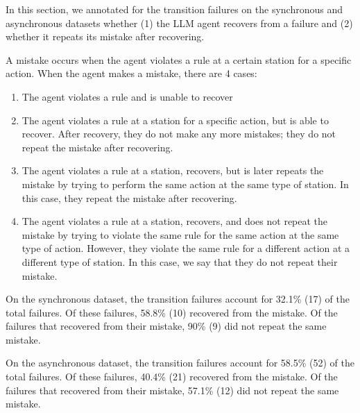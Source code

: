 In this section, we annotated for the transition failures on the synchronous and asynchronous datasets whether (1) the LLM agent recovers from a failure and (2) whether it repeats its mistake after recovering.


A mistake occurs when the agent violates a rule at a certain station for a specific action. When the agent makes a mistake, there are 4 cases:
\begin{enumerate}
    \item The agent violates a rule and is unable to recover
    \item The agent violates a rule at a station for a specific action, but is able to recover. After recovery, they do not make any more mistakes; they do not repeat the mistake after recovering. 
    \item The agent violates a rule at a station, recovers, but is later repeats the mistake by trying to perform the same action at the same type of station. In this case, they repeat the mistake after recovering. 
    \item The agent violates a rule at a station, recovers, and does not repeat the mistake by trying to violate the same rule for the same action at the same type of action. However, they violate the same rule for a different action at a different type of station. In this case, we say that they do not repeat their mistake. 
\end{enumerate}

On the synchronous dataset, the transition failures account for 32.1\% (17) of the total failures. Of these failures, 58.8\% (10) recovered from the mistake. Of the failures that recovered from their mistake, 90\% (9) did not repeat the same mistake.

On the asynchronous dataset, the transition failures account for 58.5\% (52) of the total failures. Of these failures, 40.4\% (21) recovered from the mistake. Of the failures that recovered from their mistake, 57.1\% (12) did not repeat the same mistake.


